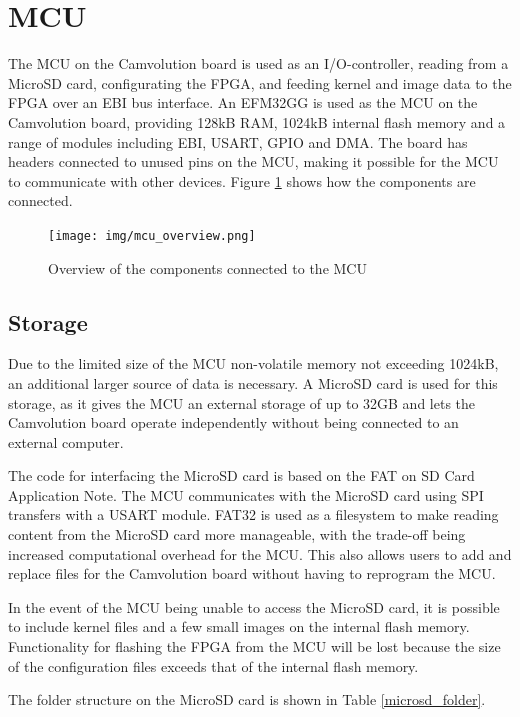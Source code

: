 \section{MCU}

The MCU on the Camvolution board is used as an I/O-controller, reading from a MicroSD card, configurating the FPGA, and feeding kernel and image data to the FPGA over an EBI bus interface. An EFM32GG is used as the MCU on the Camvolution board, providing 128kB RAM, 1024kB internal flash memory and a range of modules including EBI, USART, GPIO and DMA. The board has headers connected to unused pins on the MCU, making it possible for the MCU to communicate with other devices. Figure \ref{fig:mcuOverview} shows how the components are connected.

\begin{figure}[h!]
    \texttt{[image: img/mcu\_overview.png]}
    \caption{Overview of the components connected to the MCU}
    \label{fig:mcuOverview}
\end{figure}

\subsection{Storage}
Due to the limited size of the MCU non-volatile memory not exceeding 1024kB, an additional larger source of data is necessary. A MicroSD card is used for this storage, as it gives the MCU an external storage of up to 32GB and lets the Camvolution board operate independently without being connected to an external computer.

The code for interfacing the MicroSD card is based on the FAT on SD Card Application Note\cite{an0030}. The MCU communicates with the MicroSD card using SPI transfers with a USART module. FAT32 is used as a filesystem to make reading content from the MicroSD card more manageable, with the trade-off being increased computational overhead for the MCU. This also allows users to add and replace files for the Camvolution board without having to reprogram the MCU.

In the event of the MCU being unable to access the MicroSD card, it is possible to include kernel files and a few small images on the internal flash memory. Functionality for flashing the FPGA from the MCU will be lost because the size of the configuration files exceeds that of the internal flash memory.

The folder structure on the MicroSD card is shown in Table \ref{microsd_folder}.

